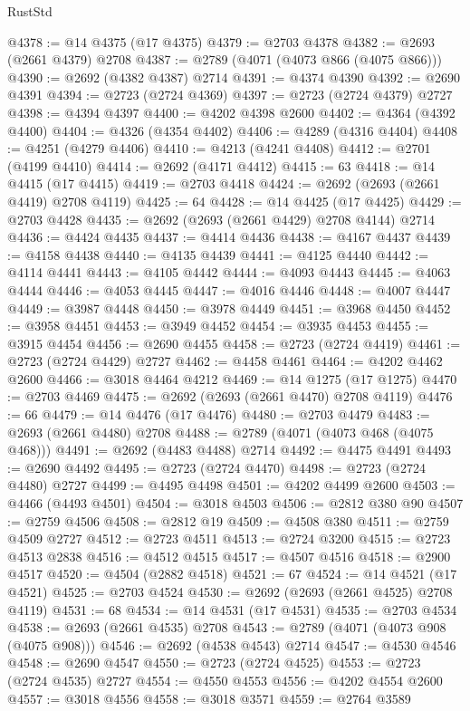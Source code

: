 \begin{lexlean}{RustStd}
\begin{coremodule}
@4378 := @14 @4375 (@17 @4375)
@4379 := @2703 @4378
@4382 := @2693 (@2661 @4379) @2708
@4387 := @2789 (@4071 (@4073 @866 (@4075 @866)))
@4390 := @2692 (@4382 @4387) @2714
@4391 := @4374 @4390
@4392 := @2690 @4391
@4394 := @2723 (@2724 @4369)
@4397 := @2723 (@2724 @4379) @2727
@4398 := @4394 @4397
@4400 := @4202 @4398 @2600
@4402 := @4364 (@4392 @4400)
@4404 := @4326 (@4354 @4402)
@4406 := @4289 (@4316 @4404)
@4408 := @4251 (@4279 @4406)
@4410 := @4213 (@4241 @4408)
@4412 := @2701 (@4199 @4410)
@4414 := @2692 (@4171 @4412)
@4415 := 63
@4418 := @14 @4415 (@17 @4415)
@4419 := @2703 @4418
@4424 := @2692 (@2693 (@2661 @4419) @2708 @4119)
@4425 := 64
@4428 := @14 @4425 (@17 @4425)
@4429 := @2703 @4428
@4435 := @2692 (@2693 (@2661 @4429) @2708 @4144) @2714
@4436 := @4424 @4435
@4437 := @4414 @4436
@4438 := @4167 @4437
@4439 := @4158 @4438
@4440 := @4135 @4439
@4441 := @4125 @4440
@4442 := @4114 @4441
@4443 := @4105 @4442
@4444 := @4093 @4443
@4445 := @4063 @4444
@4446 := @4053 @4445
@4447 := @4016 @4446
@4448 := @4007 @4447
@4449 := @3987 @4448
@4450 := @3978 @4449
@4451 := @3968 @4450
@4452 := @3958 @4451
@4453 := @3949 @4452
@4454 := @3935 @4453
@4455 := @3915 @4454
@4456 := @2690 @4455
@4458 := @2723 (@2724 @4419)
@4461 := @2723 (@2724 @4429) @2727
@4462 := @4458 @4461
@4464 := @4202 @4462 @2600
@4466 := @3018 @4464 @4212
@4469 := @14 @1275 (@17 @1275)
@4470 := @2703 @4469
@4475 := @2692 (@2693 (@2661 @4470) @2708 @4119)
@4476 := 66
@4479 := @14 @4476 (@17 @4476)
@4480 := @2703 @4479
@4483 := @2693 (@2661 @4480) @2708
@4488 := @2789 (@4071 (@4073 @468 (@4075 @468)))
@4491 := @2692 (@4483 @4488) @2714
@4492 := @4475 @4491
@4493 := @2690 @4492
@4495 := @2723 (@2724 @4470)
@4498 := @2723 (@2724 @4480) @2727
@4499 := @4495 @4498
@4501 := @4202 @4499 @2600
@4503 := @4466 (@4493 @4501)
@4504 := @3018 @4503
@4506 := @2812 @380 @90
@4507 := @2759 @4506
@4508 := @2812 @19
@4509 := @4508 @380
@4511 := @2759 @4509 @2727
@4512 := @2723 @4511
@4513 := @2724 @3200
@4515 := @2723 @4513 @2838
@4516 := @4512 @4515
@4517 := @4507 @4516
@4518 := @2900 @4517
@4520 := @4504 (@2882 @4518)
@4521 := 67
@4524 := @14 @4521 (@17 @4521)
@4525 := @2703 @4524
@4530 := @2692 (@2693 (@2661 @4525) @2708 @4119)
@4531 := 68
@4534 := @14 @4531 (@17 @4531)
@4535 := @2703 @4534
@4538 := @2693 (@2661 @4535) @2708
@4543 := @2789 (@4071 (@4073 @908 (@4075 @908)))
@4546 := @2692 (@4538 @4543) @2714
@4547 := @4530 @4546
@4548 := @2690 @4547
@4550 := @2723 (@2724 @4525)
@4553 := @2723 (@2724 @4535) @2727
@4554 := @4550 @4553
@4556 := @4202 @4554 @2600
@4557 := @3018 @4556
@4558 := @3018 @3571
@4559 := @2764 @3589

\end{coremodule}
\end{lexlean}
